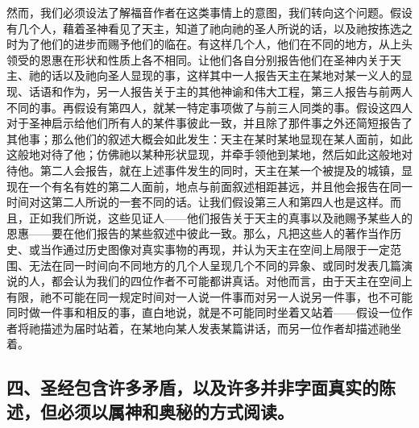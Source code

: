 然而，我们必须设法了解福音作者在这类事情上的意图，我们转向这个问题。假设有几个人，藉着圣神看见了天主，知道了祂向祂的圣人所说的话，以及祂按拣选之时为了他们的进步而赐予他们的临在。有这样几个人，他们在不同的地方，从上头领受的恩惠在形状和性质上各不相同。让他们各自分别报告他们在圣神内关于天主、祂的话以及祂向圣人显现的事，这样其中一人报告天主在某地对某一义人的显现、话语和作为，另一人报告关于主的其他神谕和伟大工程，第三人报告与前两人不同的事。再假设有第四人，就某一特定事项做了与前三人同类的事。假设这四人对于圣神启示给他们所有人的某件事彼此一致，并且除了那件事之外还简短报告了其他事；那么他们的叙述大概会如此发生：天主在某时某地显现在某人面前，如此这般地对待了他；仿佛祂以某种形状显现，并牵手领他到某地，然后如此这般地对待他。第二人会报告，就在上述事件发生的同时，天主在某一个被提及的城镇，显现在一个有名有姓的第二人面前，地点与前面叙述相距甚远，并且他会报告在同一时间对这第二人所说的一套不同的话。让我们假设第三人和第四人也是这样。而且，正如我们所说，这些见证人——他们报告关于天主的真事以及祂赐予某些人的恩惠——要在他们报告的某些叙述中彼此一致。那么，凡把这些人的著作当作历史、或当作通过历史图像对真实事物的再现，并认为天主在空间上局限于一定范围、无法在同一时间向不同地方的几个人呈现几个不同的异象、或同时发表几篇演说的人，都会认为我们的四位作者不可能都讲真话。对他而言，由于天主在空间上有限，祂不可能在同一规定时间对一人说一件事而对另一人说另一件事，也不可能同时做一件事和相反的事，直白地说，就是不可能同时坐着又站着——假设一位作者将祂描述为届时站着，在某地向某人发表某篇讲话，而另一位作者却描述祂坐着。\par


\subsection{四、圣经包含许多矛盾，以及许多并非字面真实的陈述，但必须以属神和奥秘的方式阅读。}

